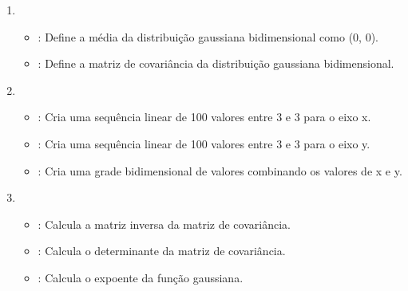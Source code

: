 \documentclass[letterpaper,10pt,english]{jupyterBook}
\begin{document}
\begin{enumerate}
%
\item {} 
\sphinxAtStartPar
{}
\begin{itemize}
\item {} 
\sphinxAtStartPar
{}: Define a média da distribuição gaussiana bidimensional como (0, 0).

\item {} 
\sphinxAtStartPar
{}: Define a matriz de covariância da distribuição gaussiana bidimensional.

\end{itemize}

\item {} 
\sphinxAtStartPar
{}
\begin{itemize}
\item {} 
\sphinxAtStartPar
{}: Cria uma sequência linear de 100 valores entre \sphinxhyphen{}3 e 3 para o eixo x.

\item {} 
\sphinxAtStartPar
{}: Cria uma sequência linear de 100 valores entre \sphinxhyphen{}3 e 3 para o eixo y.

\item {} 
\sphinxAtStartPar
{}: Cria uma grade bidimensional de valores combinando os valores de x e y.

\end{itemize}

\item {} 
\sphinxAtStartPar
{}
\begin{itemize}
\item {} 
\sphinxAtStartPar
{}: Calcula a matriz inversa da matriz de covariância.

\item {} 
\sphinxAtStartPar
{}: Calcula o determinante da matriz de covariância.

\item {} 
\sphinxAtStartPar
{}: Calcula o expoente da função gaussiana.


\end{itemize}
\end{enumerate}
\end{document}
